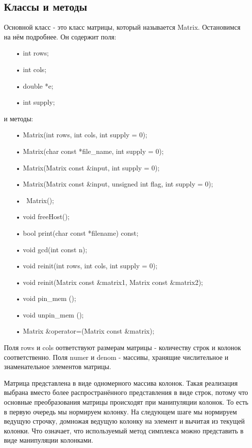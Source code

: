 \documentclass[a4paper,14pt,russian]{extreport}
\begin{document}
\subsection{Классы и методы}
Основной класс - это класс матрицы, который называется Matrix. Остановимся на нём подробнее. Он содержит поля:
\begin{itemize}
\item[•] int rows;
\item[•] int cols;
\item[•] double *e;
\item[•] int supply;
\end{itemize}
и методы:
\begin{itemize}
\item[•] Matrix(int rows, int cols, int supply = 0);
\item[•] Matrix(char const *file\_name, int supply = 0);
\item[•] Matrix(Matrix const \&input, int supply = 0);
\item[•] Matrix(Matrix const \&input, unsigned int flag, int supply = 0);
\item[•] ~Matrix();
\item[•] void freeHost();
\item[•] bool print(char const *filename) const;
\item[•] void gcd(int const n);
\item[•] void reinit(int rows, int cols, int supply = 0);
\item[•] void reinit(Matrix const \&matrix1, Matrix const \&matrix2);
\item[•] void pin\_mem ();
\item[•] void unpin\_mem ();
\item[•] Matrix \&operator=(Matrix const \&matrix);
\end{itemize}
\par
Поля rows и cols оответствуют размерам матрицы - количеству строк и колонок соответственно. Поля numer и denom - массивы, хранящие числительное и знаменательное элементов матрицы.
\par
Матрица представлена в виде одномерного массива колонок. Такая реализация выбрана вместо более распространённого представления в виде строк, потому что основные преобразования матрицы происходят при манипуляции колонок. То есть в первую очередь мы нормируем колонку. На следующем шаге мы нормируем ведущую строчку, домножая ведущую колонку на элемент и вычитая из текущей колонки. Что означает, что используемый метод симплекса можно представить в виде манипуляции колонками.
\end{document}
